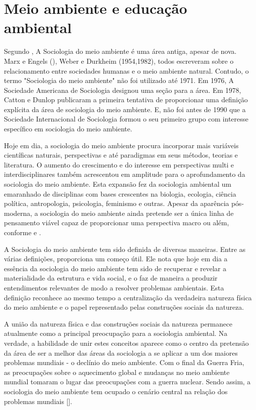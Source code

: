 \section{Meio ambiente e educação ambiental}

Segundo , A Sociologia do meio ambiente é uma área antiga, apesar de nova. Marx e Engels (), Weber e Durkheim (1954,1982), todos escreveram sobre o relacionamento entre sociedades humanas e o meio ambiente natural. Contudo, o termo "Sociologia do meio ambiente"  não foi utilizado até 1971. Em 1976, A Sociedade Americana de Sociologia designou uma seção para a área. Em 1978, Catton e Dunlop publicaram a primeira tentativa de proporcionar uma definição explícita da área de sociologia do meio ambiente. E, não foi antes de 1990 que a Sociedade Internacional de Sociologia formou o seu primeiro grupo com interesse específico em sociologia do meio ambiente.

Hoje em dia, a sociologia do meio ambiente procura incorporar mais variáveis científicas naturais, perspectivas e até paradigmas em seus métodos, teorias e literatura. O aumento do crescimento e do interesse em perspectivas multi e interdisciplinares também acrescentou em amplitude para o aprofundamento da sociologia do meio ambiente. Esta expansão fez da sociologia ambiental um emaranhado de disciplinas com bases crescentes na biologia, ecologia, ciência política, antropologia, psicologia, feminismo e outras. Apesar da aparência pós-moderna, a sociologia do meio ambiente ainda pretende ser a única linha de pensamento viável capaz de proporcionar uma perspectiva macro ou além, conforme  e .

A Sociologia do meio ambiente tem sido definida de diversas maneiras. Entre as várias definições,   proporciona um começo útil. Ele nota que hoje em dia a essência da sociologia do meio ambiente tem sido de recuperar e revelar a materialidade da estrutura e vida social, e o faz de maneira a produzir entendimentos relevantes de modo a resolver problemas ambientais. Esta definição reconhece ao mesmo tempo a centralização da verdadeira natureza física do meio ambiente e o papel representado pelas construções sociais da natureza.

A união da natureza física e das construções sociais da natureza permanece atualmente como a principal preocupação para a sociologia ambiental. Na verdade, a habilidade de unir estes conceitos aparece como o centro da pretensão da área de ser a melhor das áreas da sociologia a se aplicar a um dos maiores problemas mundiais - o declínio do meio ambiente. Com o final da Guerra Fria, as preocupações sobre o aquecimento global e mudanças no meio ambiente mundial tomaram o lugar das preocupações com a guerra nuclear. Sendo assim, a sociologia do meio ambiente tem ocupado o cenário central na relação dos problemas mundiais [].

